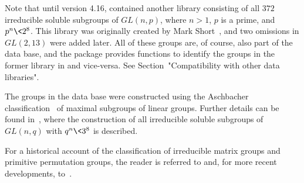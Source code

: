 Note that until version 4.16, {\GAP} contained another library consisting of all $372$ irreducible soluble
subgroups of $GL(n, p)$, where $n > 1$, $p$ is a prime, and $p^n \< 2^8$. This library 
was originally
created by Mark Short~\cite{Sho}, and two omissions in $GL(2,13)$ were added later.
All of these groups are,  of course, also part of the {\IRREDSOL} data base, and the
{\IRREDSOL} package provides functions to identify the groups in the former
{\GAP} library in {\IRREDSOL} and vice-versa. See
Section~"Compatibility with other data libraries".

The groups in the {\IRREDSOL} data base were constructed using the Aschbacher 
classification~\cite{Asc} of maximal subgroups of linear groups. Further details can be found 
in~\cite{EH}, where the 
construction of all irreducible soluble subgroups of $GL(n, q)$ with $q^n \< 3^8$
is described.

For a historical account of the classification of irreducible matrix groups and
primitive permutation groups, the reader is referred to \cite{Sho} and, 
for more recent developments, to~\cite{EH}.


